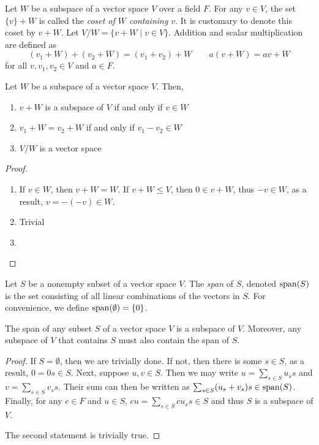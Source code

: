\begin{definition}
    Let $W$ be a subspace of a vector space $V$ over a field $F$. For any $v\in V$, the set $\{v\} + W$ is called the \textit{coset of $W$ containing $v$}. It is customary to denote this coset by $v + W$. Let $V/W = \{v + W\mid v\in V\}$. Addition and scalar multiplication are defined as 
    \begin{equation*}
        (v_1 + W) + (v_2 + W) = (v_1 + v_2) + W\qquad a(v + W) = av + W
    \end{equation*}
    for all $v, v_1, v_2\in V$ and $a\in F$.
\end{definition}

\begin{theorem}
    Let $W$ be a subspace of a vector space $V$. Then, 
    \begin{enumerate}
        \item $v + W$ is a subspace of $V$ if and only if $v\in W$ 
        \item $v_1 + W = v_2 + W$ if and only if $v_1 - v_2\in W$
        \item $V/W$ is a vector space
    \end{enumerate}
\end{theorem}
\begin{proof}
    \hfill 
    \begin{enumerate}
        \item If $v\in W$, then $v + W = W$. If $v + W\le V$, then $0\in v + W$, thus $-v \in W$, as a result, $v = -(-v)\in W$.
        \item Trivial 
        \item 
    \end{enumerate}
\end{proof}

\begin{definition}
    Let $S$ be a nonempty subset of a vector space $V$. The \textit{span} of $S$, denoted $\operatorname{span}(S)$ is the set consisting of all linear combinations of the vectors in $S$. For convenience, we define $\operatorname{span}(\emptyset) = \{0\}$.
\end{definition}

\begin{theorem}
    The span of any subset $S$ of a vector space $V$ is a subspace of $V$. Moreover, any subspace of $V$ that contains $S$ must also contain the span of $S$.
\end{theorem}
\begin{proof}
    If $S=\emptyset$, then we are trivially done. If not, then there is some $s\in S$, as a result, $0 = 0s\in S$. Next, suppose $u,v\in S$. Then we may write $u = \sum_{s\in S}u_ss$ and $v = \sum_{s\in S}v_ss$. Their sum can then be written as $\sum_{s\in S}(u_s + v_s)s\in\operatorname{span}(S)$. Finally, for any $c\in F$ and $u\in S$, $cu = \sum_{s\in S}cu_ss\in S$ and thus $S$ is a subspace of $V$.

    The second statement is trivially true.
\end{proof}


